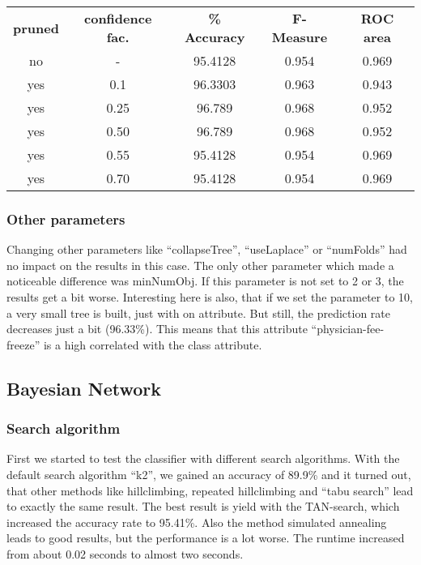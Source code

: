\documentclass{article}
\begin{document}
\begin{center}
\begin{tabular}{ c | c | c | c | c }
\textbf{pruned} & \textbf{confidence fac.} & \textbf{\% Accuracy} & \textbf{F-Measure} & \textbf{ROC area}\\
no & - & 95.4128 & 0.954 & 0.969 \\
yes & 0.1 & 96.3303 & 0.963 & 0.943 \\
yes & 0.25 & 96.789 & 0.968 & 0.952 \\	
yes & 0.50 & 96.789 & 0.968 & 0.952 \\
yes & 0.55 & 95.4128 & 0.954 & 0.969 \\
yes & 0.70 & 95.4128 & 0.954 & 0.969 \\
\end{tabular}
\end{center} 

\subsubsection{Other parameters}
 
Changing other parameters like “collapseTree”, “useLaplace” or “numFolds” had no impact on the results in this case. The only other parameter which made a noticeable difference was minNumObj. If this parameter is not set to 2 or 3, the results get a bit worse. Interesting here is also, that if we set the parameter to 10, a very small tree is built, just with on attribute. But still, the prediction rate decreases just a bit (96.33\%). This means that this attribute “physician-fee-freeze” is a high correlated with the class attribute. 
 
 
\subsection{Bayesian Network}
 
\subsubsection{Search algorithm}
 
First we started to test the classifier with different search algorithms. With the default search algorithm “k2”, we gained an accuracy of 89.9\% and it turned out, that other methods like hillclimbing, repeated hillclimbing and “tabu search” lead to exactly the same result. The best result is yield with the TAN-search, which increased the accuracy rate to 95.41\%. Also the method simulated annealing leads to good results, but the performance is a lot worse. The runtime increased from about 0.02 seconds to almost two seconds. 
 
\end{document}
